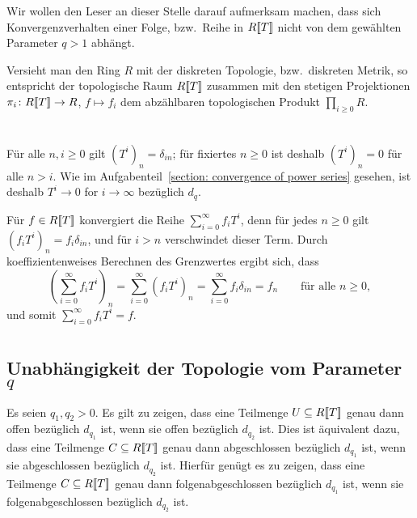 \documentclass[a4paper, 10pt, numbers=noenddot]{scrartcl}
\begin{document}
Wir wollen den Leser an dieser Stelle darauf aufmerksam machen, dass sich Konvergenzverhalten einer Folge, bzw.\ Reihe in $R[\![T]\!]$ nicht von dem gewählten Parameter $q > 1$ abhängt.

\begin{remark}
  Versieht man den Ring $R$ mit der diskreten Topologie, bzw.\ diskreten Metrik, so entspricht der topologische Raum $R[\![T]\!]$ zusammen mit den stetigen Projektionen $\pi_i \colon R[\![T]\!] \to R$, $f \mapsto f_i$ dem abzählbaren topologischen Produkt $\prod_{i \geq 0} R$.
\end{remark}





\section{}

Für alle $n, i \geq 0$ gilt $(T^i)_n = \delta_{in}$;
für fixiertes $n \geq 0$ ist deshalb $(T^i)_n = 0$ für alle $n > i$.
Wie im Aufgabenteil~\ref{section: convergence of power series} gesehen, ist deshalb $T^i \to 0$ for $i \to \infty$ bezüglich $d_q$.

Für $f \in R[\![T]\!]$ konvergiert die Reihe $\sum_{i=0}^\infty f_i T^i$, denn für jedes $n \geq 0$ gilt $(f_i T^i)_n = f_i \delta_{in}$, und für $i > n$ verschwindet dieser Term.
Durch koeffizientenweises Berechnen des Grenzwertes ergibt sich, dass
\[
    \left( \sum_{i=0}^\infty f_i T^i \right)_n
  = \sum_{i=0}^\infty (f_i T^i)_n
  = \sum_{i=0}^\infty f_i \delta_{in}
  = f_n
  \qquad
  \text{für alle $n \geq 0$},
\]
und somit $\sum_{i=0}^\infty f_i T^i = f$.





\section{}



\subsection*{Unabhängigkeit der Topologie vom Parameter $q$}


Es seien $q_1, q_2 > 0$.
Es gilt zu zeigen, dass eine Teilmenge $U \subseteq R[\![T]\!]$ genau dann offen bezüglich $d_{q_1}$ ist, wenn sie offen bezüglich $d_{q_2}$ ist.
Dies ist äquivalent dazu, dass eine Teilmenge $C \subseteq R[\![T]\!]$ genau dann abgeschlossen bezüglich $d_{q_1}$ ist, wenn sie abgeschlossen bezüglich $d_{q_2}$ ist.
Hierfür genügt es zu zeigen, dass eine Teilmenge $C \subseteq R[\![T]\!]$ genau dann folgenabgeschlossen bezüglich $d_{q_1}$ ist, wenn sie folgenabgeschlossen bezüglich $d_{q_2}$ ist.
\end{document}
